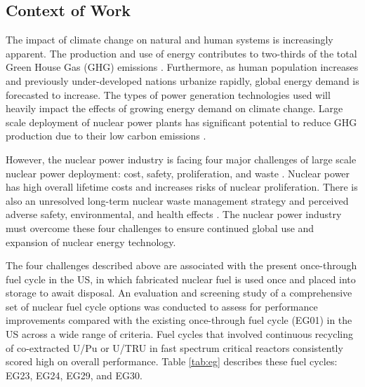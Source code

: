\subsection{Context of Work}
The impact of climate change on natural and human systems 
is increasingly apparent.
The production and use of energy contributes to 
two-thirds of the total Green House Gas (GHG) 
emissions \cite{noauthor_climate_2018}.
Furthermore, as human population increases and previously 
under-developed nations urbanize rapidly, 
global energy demand is forecasted to increase.  
The types of power generation technologies used 
will heavily impact the effects of growing energy demand 
on climate change.  
Large scale deployment of nuclear power plants has significant 
potential to reduce GHG production due to their low 
carbon emissions \cite{noauthor_climate_2018}.  

However, the nuclear power industry is facing four major challenges 
of large scale nuclear power deployment: 
cost, safety, proliferation, and waste 
\cite{massachusetts_institute_of_technology_future_2003}. 
Nuclear power has high overall lifetime costs and increases 
risks of nuclear proliferation. 
There is also an unresolved long-term nuclear waste management 
strategy and perceived adverse safety, environmental, and health 
effects \cite{massachusetts_institute_of_technology_future_2003}. 
The nuclear power industry must overcome these four challenges 
to ensure continued global use and expansion 
of nuclear energy technology. 

The four challenges described above are associated with 
the present once-through fuel cycle in the \gls{US}, 
in which fabricated nuclear fuel is used once and placed into 
storage to await disposal. 
An evaluation and screening study of a comprehensive set of nuclear 
fuel cycle options \cite{wigeland_nuclear_2014} was conducted to assess 
for performance improvements compared with the existing once-through 
fuel cycle (EG01) in the \gls{US} across a wide range of criteria. 
Fuel cycles that involved continuous recycling
of co-extracted U/Pu or U/TRU in fast spectrum critical reactors
consistently scored high on overall performance.  
Table \ref{tab:eg} describes these fuel cycles:
EG23, EG24, EG29, and EG30. 

